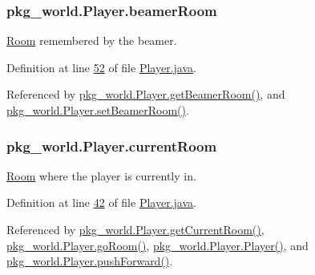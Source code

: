 \hypertarget{classpkg__world_1_1Player_aadfcdea19eefea1137932f9329c08209}{
\subsubsection[{beamer\-Room}]{ pkg\-\_\-world.\-Player.\-beamer\-Room\hspace{0.3cm}{\ttfamily [private]}}}\label{classpkg__world_1_1Player_aadfcdea19eefea1137932f9329c08209}


\hyperlink{classpkg__world_1_1Room}{Room} remembered by the beamer. 



Definition at line \hyperlink{Player_8java_source_l00052}{52} of file \hyperlink{Player_8java_source}{Player.\-java}.



Referenced by \hyperlink{Player_8java_source_l00157}{pkg\-\_\-world.\-Player.\-get\-Beamer\-Room()}, and \hyperlink{Player_8java_source_l00149}{pkg\-\_\-world.\-Player.\-set\-Beamer\-Room()}.

\hypertarget{classpkg__world_1_1Player_a2b0217339fe7077674b0e0a1ad33cc1e}{
\subsubsection[{current\-Room}]{ pkg\-\_\-world.\-Player.\-current\-Room\hspace{0.3cm}{\ttfamily [private]}}}\label{classpkg__world_1_1Player_a2b0217339fe7077674b0e0a1ad33cc1e}


\hyperlink{classpkg__world_1_1Room}{Room} where the player is currently in. 



Definition at line \hyperlink{Player_8java_source_l00042}{42} of file \hyperlink{Player_8java_source}{Player.\-java}.



Referenced by \hyperlink{Player_8java_source_l00095}{pkg\-\_\-world.\-Player.\-get\-Current\-Room()}, \hyperlink{Player_8java_source_l00103}{pkg\-\_\-world.\-Player.\-go\-Room()}, \hyperlink{Player_8java_source_l00059}{pkg\-\_\-world.\-Player.\-Player()}, and \hyperlink{Player_8java_source_l00126}{pkg\-\_\-world.\-Player.\-push\-Forward()}.

